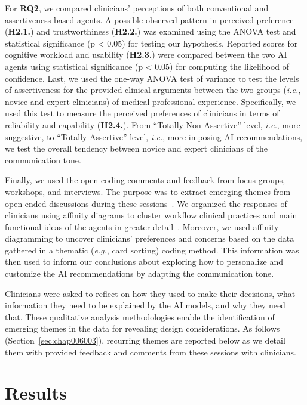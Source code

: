 For {\bf RQ2}, we compared clinicians' perceptions of both conventional and assertiveness-based agents.
A possible observed pattern in perceived preference ({\bf H2.1.}) and trustworthiness ({\bf H2.2.}) was examined using the \ac{ANOVA} test and statistical significance (p < 0.05) for testing our hypothesis.
Reported scores for cognitive workload and usability ({\bf H2.3.}) were compared between the two AI agents using statistical significance (p < 0.05) for computing the likelihood of confidence.
Last, we used the one-way \ac{ANOVA} test of variance to test the levels of assertiveness for the provided clinical arguments between the two groups ({\it i.e.}, novice and expert clinicians) of medical professional experience.
Specifically, we used this test to measure the perceived preferences of clinicians in terms of reliability and capability ({\bf H2.4.}).
From ``Totally Non-Assertive'' level, {\it i.e.}, more suggestive, to ``Totally Assertive'' level, {\it i.e.}, more imposing AI recommendations, we test the overall tendency between novice and expert clinicians of the communication tone.

Finally, we used the open coding comments and feedback from focus groups, workshops, and interviews.
The purpose was to extract emerging themes from open-ended discussions during these sessions~\cite{SHIBUYA2022107131, BIEG2022107249}.
We organized the responses of clinicians using affinity diagrams to cluster workflow clinical practices and main functional ideas of the agents in greater detail~\cite{DEUTSCH2019122, 10.1145/3491101.3519863}.
Moreover, we used affinity diagramming to uncover clinicians' preferences and concerns based on the data gathered in a thematic ({\it e.g.}, card sorting) coding method.
This information was then used to inform our conclusions about exploring how to personalize and customize the AI recommendations by adapting the communication tone.

Clinicians were asked to reflect on how they used to make their decisions, what information they need to be explained by the AI models, and why they need that.
These qualitative analysis methodologies enable the identification of emerging themes in the data for revealing design considerations.
As follows (Section~\ref{sec:chap006003}), recurring themes are reported below as we detail them with provided feedback and comments from these sessions with clinicians.

\section{Results}
\label{sec:chap006006}

